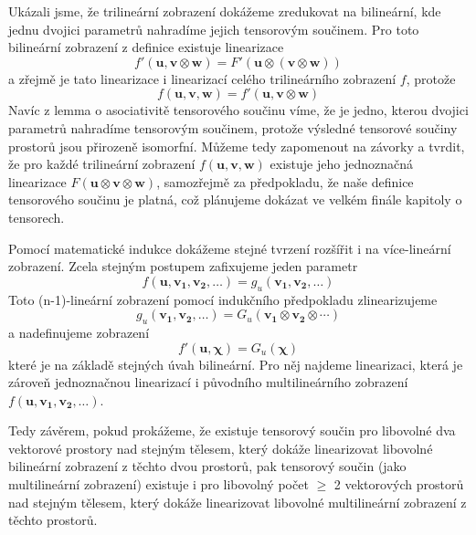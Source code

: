 \documentclass[a5paper,12pt]{amsbook}
\theoremstyle{definition}
\newcommand{\myvec}[1]{\mathbf{#1}}
\begin{document}
Ukázali jsme, že trilineární zobrazení dokážeme zredukovat na bilineární, kde jednu dvojici parametrů
nahradíme jejich tensorovým součinem. Pro toto bilineární zobrazení z definice existuje linearizace
\begin{equation*}
f'(\myvec{u}, \myvec{v}\otimes\myvec{w}) = F'(\myvec{u}\otimes(\myvec{v}\otimes\myvec{w}))
\end{equation*}
a zřejmě je tato linearizace i linearizací celého trilineárního zobrazení $f$, protože
\begin{equation*}
f(\myvec{u}, \myvec{v}, \myvec{w}) = f'(\myvec{u}, \myvec{v}\otimes\myvec{w})
\end{equation*}
Navíc z lemma o asociativitě tensorového součinu víme, že je jedno, kterou dvojici parametrů
nahradíme tensorovým součinem, protože výsledné tensorové součiny prostorů jsou přirozeně
isomorfní. Můžeme tedy zapomenout na závorky a tvrdit, že pro každé trilineární zobrazení
$f(\myvec{u}, \myvec{v}, \myvec{w})$ existuje jeho jednoznačná linearizace
$F(\myvec{u}\otimes\myvec{v}\otimes\myvec{w})$, samozřejmě za předpokladu, že naše definice
tensorového součinu je platná, což plánujeme dokázat ve velkém finále kapitoly o tensorech.

Pomocí matematické indukce dokážeme stejné tvrzení rozšířit i na více-lineární zobrazení. Zcela
stejným postupem zafixujeme jeden parametr
\begin{equation*}
f(\myvec{u}, \myvec{v_1}, \myvec{v_2}, \hdots) = g_u(\myvec{v_1}, \myvec{v_2}, \hdots)
\end{equation*}
Toto (n-1)-lineární zobrazení pomocí indukčního předpokladu zlinearizujeme
\begin{equation*}
g_u(\myvec{v_1}, \myvec{v_2}, \hdots) = G_u(\myvec{v_1}\otimes\myvec{v_2}\otimes\cdots)
\end{equation*}
a nadefinujeme zobrazení
\begin{equation*}
f'(\myvec{u}, \myvec{\chi}) = G_u(\myvec{\chi})
\end{equation*}
které je na základě stejných úvah bilineární. Pro něj najdeme linearizaci, která je zároveň
jednoznačnou linearizací i původního multilineárního zobrazení
$f(\myvec{u}, \myvec{v_1}, \myvec{v_2}, \hdots)$.

Tedy závěrem, pokud prokážeme, že existuje tensorový součin pro libovolné dva vektorové prostory
nad stejným tělesem, který dokáže linearizovat libovolné bilineární zobrazení z těchto dvou
prostorů, pak tensorový součin (jako multilineární zobrazení) existuje i pro libovolný počet
$\geq$ 2 vektorových prostorů nad stejným tělesem, který dokáže linearizovat libovolné multilineární
zobrazení z těchto prostorů.
\end{document}
